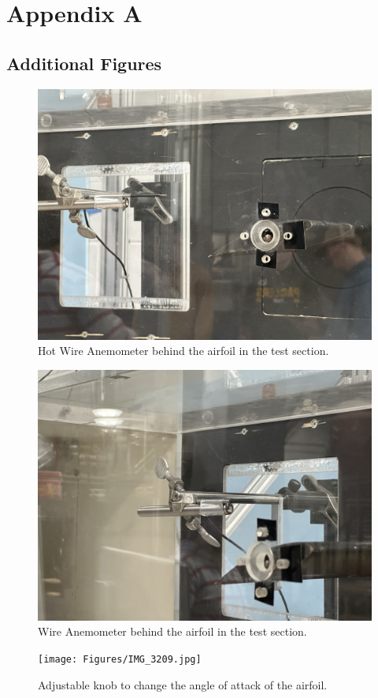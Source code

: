\chapter{Appendix A}

\section{Additional Figures} \label{sec:additional_figures}

\begin{figure}[htpb]
    \centering
    \includegraphics[width=0.75\linewidth]{Figures/IMG_3205.jpg}
    \caption[Hot Wire Anemometer behind the airfoil in the test section.]{Hot Wire Anemometer behind the airfoil in the test section.}
    \label{fig: HotWireAnemometerclose}
\end{figure}

\begin{figure}[htpb]
    \centering
    \includegraphics[width=0.75\linewidth]{Figures/IMG_3206.jpg}
    \caption[Hot Wire Anemometer behind the airfoil in the test section.]{ Wire Anemometer behind the airfoil in the test section.}
    \label{fig: HotWireAnemometerfront}
\end{figure}

\begin{figure}[htpb]
    \centering
    \texttt{[image: Figures/IMG\_3209.jpg]}
    \caption[Adjustable knob to change the angle of attack of the airfoil.]{Adjustable knob to change the angle of attack of the airfoil.}
    \label{fig: SpeedControl}
\end{figure}



